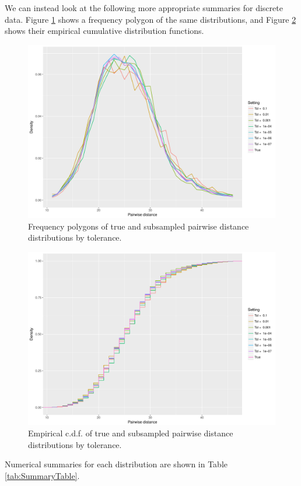 \documentclass{article}
\begin{document}
We can instead look at the following more appropriate summaries for discrete data.
Figure \ref{fig:FreqPoly} shows a frequency polygon of the same distributions, and Figure \ref{fig:ECDF} shows their empirical cumulative distribution functions.
\begin{figure}
    \includegraphics[width=\linewidth]{Figures/PairwiseDistance/freqpoly_by_tol.pdf}
    \caption{Frequency polygons of true and subsampled pairwise distance distributions by tolerance.}
    \label{fig:FreqPoly}
\end{figure}
\begin{figure}
    \includegraphics[width=\linewidth]{Figures/PairwiseDistance/ecdf_by_tol.pdf}
    \caption{Empirical c.d.f. of true and subsampled pairwise distance distributions by tolerance.}
    \label{fig:ECDF}
\end{figure}

Numerical summaries for each distribution are shown in Table \ref{tab:SummaryTable}.
\end{document}
